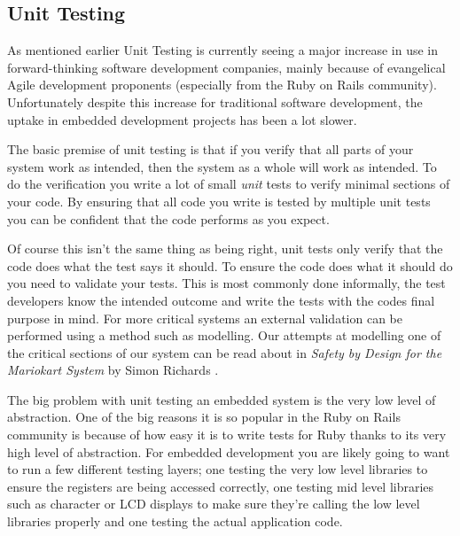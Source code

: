 \subsection{Unit Testing}

  As mentioned earlier Unit Testing is currently seeing a major increase in use
  in forward-thinking software development companies, mainly because of
  evangelical Agile development proponents (especially from the Ruby on Rails
  community).  Unfortunately despite this increase for traditional software
  development, the uptake in embedded development projects has been a lot
  slower.

  The basic premise of unit testing is that if you verify that all parts of your
  system work as intended, then the system as a whole will work as intended.  To
  do the verification you write a lot of small \emph{unit} tests to verify
  minimal sections of your code.  By ensuring that all code you write is tested
  by multiple unit tests you can be confident that the code performs as you
  expect.

  Of course this isn't the same thing as being right, unit tests only verify
  that the code does what the test says it should.  To ensure the code does what
  it should do you need to validate your tests.  This is most commonly done
  informally, the test developers know the intended outcome and write the tests
  with the codes final purpose in mind.  For more critical systems an external
  validation can be performed using a method such as modelling.  Our attempts at
  modelling one of the critical sections of our system can be read about in
  \emph{Safety by Design for the Mariokart System} by Simon Richards
  \cite{Richards_2011}.

  The big problem with unit testing an embedded system is the very low level of
  abstraction.  One of the big reasons it is so popular in the Ruby on Rails
  community is because of how easy it is to write tests for Ruby thanks to its
  very high level of abstraction.  For embedded development you are likely going
  to want to run a few different testing layers; one testing the very low level
  libraries to ensure the registers are being accessed correctly, one testing
  mid level libraries such as character or LCD displays to make sure they're
  calling the low level libraries properly and one testing the actual
  application code.
